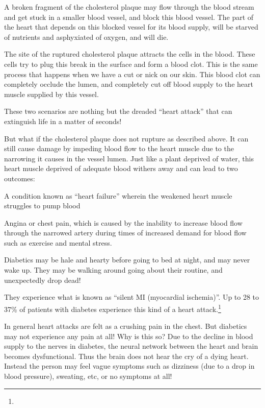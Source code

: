 \item A broken fragment of the cholesterol plaque may flow through the blood stream and get stuck in a smaller blood vessel, and block this blood vessel. The part of the heart that depends on this blocked vessel for its blood supply, will be starved of nutrients and asphyxiated of oxygen, and will die.

 \item The site of the ruptured cholesterol plaque attracts the cells in the blood. These cells try to plug this break in the surface and form a blood clot. This is the same process that happens when we have a cut or nick on our skin. This blood clot can completely occlude the lumen, and completely cut off blood supply to the heart muscle supplied by this vessel.

These two scenarios are nothing but the dreaded “heart attack” that can extinguish life in a matter of seconds!

But what if the cholesterol plaque does not rupture as described above. It can still cause damage by impeding blood flow to the heart muscle due to the narrowing it causes in the vessel lumen. Just like a plant deprived of water, this heart muscle deprived of adequate blood withers away and can lead to two outcomes:

\item A condition known as “heart failure” wherein the weakened heart muscle struggles to pump blood

 \item Angina or chest pain, which is caused by the inability to increase blood flow through the narrowed artery during times of increased demand for blood flow such as exercise and mental stress.


Diabetics may be hale and hearty before going to bed at night, and may never wake up. They may be walking around going about their routine, and unexpectedly drop dead!

They experience what is known as “silent MI (myocardial ischemia)”. Up to 28 to 37\% of patients with diabetes experience this kind of a heart attack.\footnote{}

In general heart attacks are felt as a crushing pain in the chest. But diabetics may not experience any pain at all! Why is this so? Due to the decline in blood supply to the nerves in diabetes, the neural network between the heart and brain becomes dysfunctional. Thus the brain does not hear the cry of a dying heart. Instead the person may feel vague symptoms such as dizziness (due to a drop in blood pressure), sweating, etc, or no symptoms at all!

